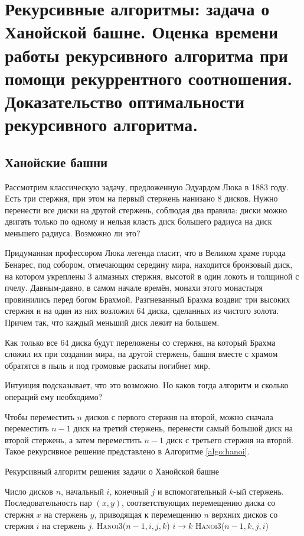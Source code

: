 \section{Рекурсивные алгоритмы: задача о Ханойской башне. Оценка времени работы 
рекурсивного алгоритма при помощи рекуррентного соотношения. Доказательство 
оптимальности рекурсивного алгоритма.}

\subsection{Ханойские башни}
Рассмотрим классическую задачу, предложенную Эдуардом Люка в 1883 году. Есть 
три стержня, при этом на первый стержень нанизано 8 дисков. Нужно перенести все 
диски на другой стержень, соблюдая два правила: диски можно двигать только по 
одному и нельзя класть
диск большего радиуса на диск меньшего радиуса. Возможно ли это?

Придуманная профессором Люка легенда гласит, что в Великом храме города Бенарес,
 под собором, отмечающим середину мира, находится бронзовый диск, на котором 
 укреплены 3 алмазных стержня, высотой в один локоть и толщиной с пчелу. 
 Давным-давно, в самом начале времён, монахи этого монастыря провинились перед 
 богом Брахмой. Разгневанный Брахма воздвиг три высоких стержня и на один из 
 них возложил 64 диска, сделанных из чистого золота. Причем так, что каждый 
 меньший диск лежит на большем.

Как только все 64 диска будут переложены со стержня, на который Брахма сложил 
их при создании мира, на другой стержень, башня вместе с храмом обратятся в пыль
 и под громовые раскаты погибнет мир.

Интуиция подсказывает, что это возможно. Но каков тогда алгоритм и сколько 
операций ему необходимо?

Чтобы переместить $n$ дисков с первого стержня на второй, можно сначала 
переместить $n - 1$ диск на третий стержень, перенести самый большой диск на 
второй стержень, а затем переместить $n - 1$ диск с третьего стержня на второй. 
Такое рекурсивное решение представлено в Алгоритме \ref{algo:hanoi}.

\begin{algorithm}[H]
  \caption{Рекурсивный алгоритм решения задачи о Ханойской башне}
  \label{algo:hanoi}
  \begin{algorithmic}[1]
    \Require Число дисков $n$, начальный $i$, конечный $j$ и вспомогательный 
    $k$-ый стержень.
    \Ensure Последовательность пар $(x, y)$, соответствующих перемещению диска 
    со стержня $x$ на стержень $y$, приводящая к перемещению $n$ верхних дисков 
    со стержня $i$ на стержень $j$.
        \State \textsc{Hanoi3}($n - 1, i, j, k$)
        \State $i \to k$
        \State \textsc{Hanoi3}($n - 1, k, j, i$)
      \EndIf
    \EndFunction
  \end{algorithmic}
\end{algorithm}

